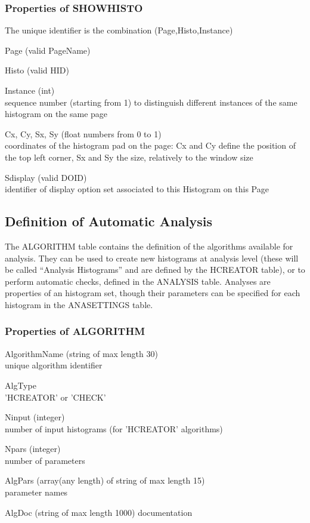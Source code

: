 \documentclass{lhcbnote}
\begin{document}
\subsubsection{Properties of SHOWHISTO}
The unique identifier is the combination (Page,Histo,Instance)
\begin{description}
\item{Page} (valid PageName)
\item{Histo} (valid HID)
\item{Instance} (int)\\
sequence number (starting from 1) to distinguish different instances
of the same histogram on the same page
\item{Cx, Cy, Sx, Sy} (float numbers from 0 to 1)\\
coordinates of the histogram pad on the page: Cx and Cy define the
position of the top left corner, Sx and Sy the size, relatively to the
window size
\item{Sdisplay} (valid DOID)\\
identifier of display option set associated to this Histogram on this Page
\end{description}

\subsection{Definition of Automatic Analysis}
The ALGORITHM table contains the definition of the algorithms
available for analysis. They can be used to create new histograms at
analysis level (these will be called ``Analysis Histograms'' and are
defined by the HCREATOR table), or to perform automatic checks,
defined in the ANALYSIS table. Analyses are properties of an histogram
set, though their parameters can be specified for each histogram in
the ANASETTINGS table.

\subsubsection{Properties of ALGORITHM}
\begin{description}
\item{AlgorithmName} (string of max length 30)\\
unique algorithm identifier
\item{AlgType} \\
'HCREATOR' or 'CHECK'
\item{Ninput} (integer)\\
number of input histograms (for 'HCREATOR' algorithms)
\item{Npars} (integer)\\
number of parameters
\item{AlgPars} (array(any length) of string of max length 15)\\
parameter names
\item{AlgDoc} (string of max length 1000)
documentation
\end{description}
\end{document}
